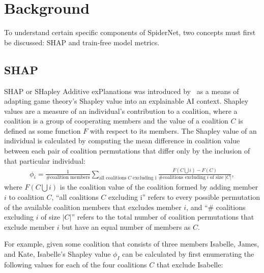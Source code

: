 \section{Background}\label{sect:spiderbackground}
To understand certain specific components of SpiderNet, two concepts must first be discussed: SHAP and train-free model metrics.

\subsection{SHAP}\label{sect:spiderbackgroundshap}
SHAP or SHapley Additive exPlanations was introduced by~\cite{lundberg2017} as a means of adapting game theory's
Shapley value into an explainable AI context. Shapley values are a measure of an individual's
contribution to a coalition, where a coalition is a group of cooperating members and
the value of a coalition $C$ is defined as some function $F$ with respect to its members. The Shapley value of an individual
is calculated by computing the mean difference in coalition value between
each pair of coalition permutations that differ only by the inclusion of that particular individual:
\begin{align}
    \phi_i = \frac{1}{\text{\# coalition members}} \sum_{\text{all coalitions}\;C\;\text{excluding i}} \frac{F(C\bigcup i) - F(C)}{\text{\# coalitions excluding}\;i\;\text{of size}\;|C|},
\end{align}
where $F(C\bigcup i)$ is the coalition value of the coalition formed by adding member $i$ to coalition $C$, ``all coalitions $C$ excluding i''
refers to every possible permutation of the available coalition members that excludes member $i$, and ``\# coalitions excluding $i$ of size $|C|$''
refers to the total number of coalition permutations that exclude member $i$ but have an equal number of members as $C$.

For example, given some coalition that consists of three members Isabelle, James, and Kate, Isabelle's Shapley value $\phi_{I}$ can be calculated
by first enumerating the following values for each of the four coalitions $C$ that exclude Isabelle:


